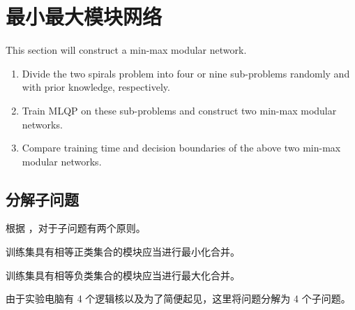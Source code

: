     \section{最小最大模块网络}

    \begin{problem}
        This section will construct a min-max modular network.
        \begin{enumerate}
            \item Divide the two spirals problem into four or nine sub-problems randomly and with prior knowledge, respectively.
            \item Train MLQP on these sub-problems and construct two min-max modular networks.
            \item Compare training time and decision boundaries of the above two min-max modular networks.
        \end{enumerate}
    \end{problem}

    \subsection{分解子问题}

    根据 \cite{minmax}，对于子问题有两个原则。
    \begin{lemma}[最小化原则]
        训练集具有相等正类集合的模块应当进行最小化合并。
    \end{lemma}
    \begin{lemma}[最大化原则]
        训练集具有相等负类集合的模块应当进行最大化合并。
    \end{lemma}

    由于实验电脑有 4 个逻辑核以及为了简便起见，这里将问题分解为 4 个子问题。

    
